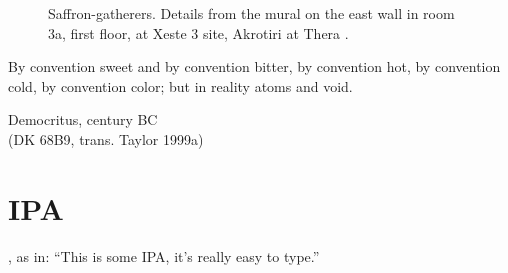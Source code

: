 \begin{figure}[!hbt]
    \centering
    \hfill
    \caption{Saffron-gatherers. Details from the mural on the east wall in room 3a, first floor, at Xeste 3 site, Akrotiri at Thera \autocite[152]{doumas_wall-paintings_1992}.}
    \label{fig:saffron_gatherers}
\end{figure}

\epigraph{By convention sweet and by convention bitter, by convention hot, by convention cold, by convention color; but in reality atoms and void.}{Democritus,  century BC\\(DK 68B9, trans. Taylor 1999a)}


\section{IPA}

\textipa{[ðIsIzsAmaIpeI]},  as in: ``This is some IPA, it's really easy to type.''

